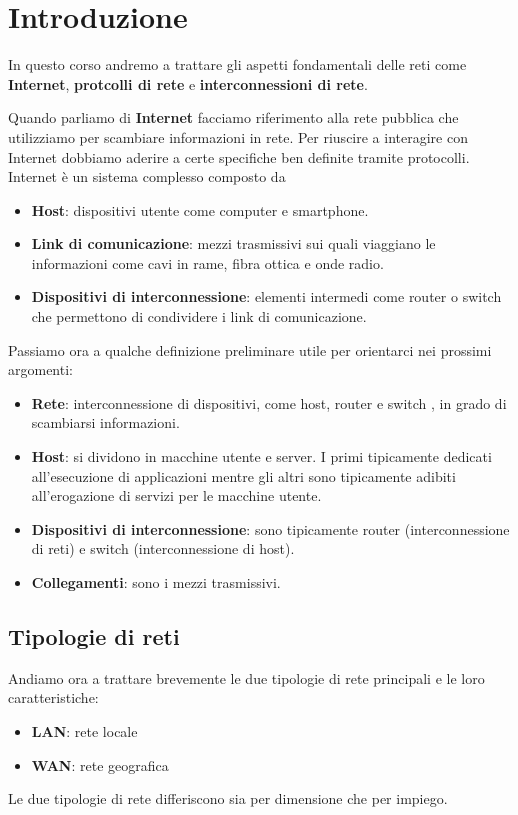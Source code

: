 \chapter{Introduzione}
In questo corso andremo a trattare gli aspetti fondamentali delle reti come \textbf{Internet}, 
\textbf{protcolli di rete} e \textbf{interconnessioni di rete}.

Quando parliamo di \textbf{Internet} facciamo riferimento alla rete pubblica che utilizziamo per 
scambiare informazioni in rete. Per riuscire a interagire con Internet dobbiamo aderire a certe
specifiche ben definite tramite protocolli. Internet è un sistema complesso composto da
\begin{itemize}
	\item \textbf{Host}: dispositivi utente come computer e smartphone.
	\item \textbf{Link di comunicazione}: mezzi trasmissivi sui quali viaggiano le informazioni
		come cavi in rame, fibra ottica e onde radio.
	\item \textbf{Dispositivi di interconnessione}: elementi intermedi come router o switch che 
		permettono di condividere i link di comunicazione.
\end{itemize}
Passiamo ora a qualche definizione preliminare utile per orientarci nei prossimi argomenti:
\begin{itemize}
	\item \textbf{Rete}: interconnessione di dispositivi, come host, router e switch , in grado di
		scambiarsi informazioni.
	\item \textbf{Host}: si dividono in macchine utente e server. I primi tipicamente dedicati
		all'esecuzione di applicazioni mentre gli altri sono tipicamente adibiti all'erogazione 
		di servizi per le macchine utente.
	\item \textbf{Dispositivi di interconnessione}: sono tipicamente router (interconnessione di 
		reti) e switch (interconnessione di host).
	\item \textbf{Collegamenti}: sono i mezzi trasmissivi.
\end{itemize}

\section{Tipologie di reti}
Andiamo ora a trattare brevemente le due tipologie di rete principali e le loro caratteristiche:
\begin{itemize}
	\item \textbf{LAN}: rete locale
	\item \textbf{WAN}: rete geografica
\end{itemize}
Le due tipologie di rete differiscono sia per dimensione che per impiego.

